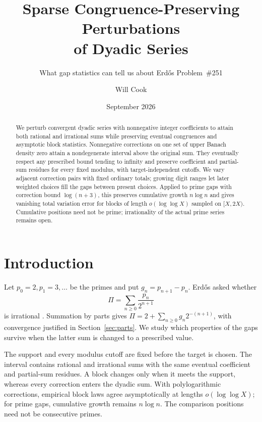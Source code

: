 \documentclass[11pt]{article}
\title{Sparse Congruence-Preserving Perturbations\\of Dyadic Series}
\subtitle{What gap statistics can tell us about Erd\H{o}s Problem~\#251}
\author{Will Cook}
\date{September 2026}
\begin{document}
\maketitle
\noteprovenance

\begin{abstract}
We perturb convergent dyadic series with nonnegative integer coefficients
to attain both rational and irrational sums while preserving eventual
congruences and asymptotic block statistics.  Nonnegative corrections on
one set of upper Banach density zero attain a nondegenerate interval above
the original sum.  They eventually respect any prescribed bound tending
to infinity and preserve coefficient and partial-sum residues for every
fixed modulus, with target-independent cutoffs.  We vary adjacent correction pairs
with fixed ordinary totals; growing digit ranges let later weighted
choices fill the gaps between present choices.  Applied to prime gaps with
correction bound $\log(n+3)$, this preserves cumulative growth $n\log n$
and gives vanishing total variation error for blocks of length
$o(\log\log X)$ sampled on $[X,2X)$.  Cumulative positions need not be
prime; irrationality of the actual prime series remains open.
\end{abstract}

\section{Introduction}\label{sec:problem}
Let $p_0=2,p_1=3,\ldots$ be the primes and put $g_n=p_{n+1}-p_n$.
Erd\H{o}s asked whether
\[
 \Pi=\sum_{n\ge0}\frac{p_n}{2^{n+1}}
\]
is irrational \cite[p.~94]{erdos1958}\cite[p.~62]{erdosgraham1980}
\cite[p.~103]{erdos1988}.  Summation by parts gives
$\Pi=2+\sum_{n\ge0}g_n2^{-(n+1)}$, with convergence justified in
Section~\ref{sec:parts}.  We study which properties of the gaps survive
when the latter sum is changed to a prescribed value.

The support and every modulus cutoff are fixed before the target is
chosen.  The interval contains rational and irrational sums with the
same eventual coefficient and partial-sum residues.  A block changes
only when it meets the support, whereas every correction enters the
dyadic sum.  With polylogarithmic corrections, empirical block laws
agree asymptotically at lengths $o(\log\log X)$; for prime gaps,
cumulative growth remains $n\log n$.  The comparison positions need
not be consecutive primes.
\end{document}
